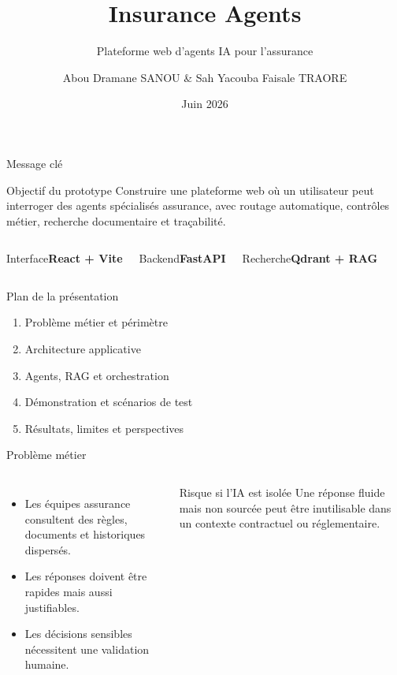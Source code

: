 \documentclass[aspectratio=169]{beamer}
\title{Insurance Agents}
\subtitle{Plateforme web d'agents IA pour l'assurance}
\date{Juin 2026}
\author{Abou Dramane SANOU \& Sah Yacouba Faisale TRAORE}
\institute{CNAM - Projet d'apprentissage automatique}
\newcommand{\metricbox}[2]{%
  \begin{block}{#1}\centering\Large\textbf{#2}\end{block}%
}
\begin{document}
\begin{frame}
  \titlepage
\end{frame}

\begin{frame}{Message clé}
  \begin{block}{Objectif du prototype}
    Construire une plateforme web où un utilisateur peut interroger des agents spécialisés assurance, avec routage automatique, contrôles métier, recherche documentaire et traçabilité.
  \end{block}

  \vspace{0.6em}
  \begin{columns}[T]
      \metricbox{Interface}{React + Vite}
      \metricbox{Backend}{FastAPI}
      \metricbox{Recherche}{Qdrant + RAG}
  \end{columns}
\end{frame}

\begin{frame}{Plan de la présentation}
  \begin{enumerate}
    \item Problème métier et périmètre
    \item Architecture applicative
    \item Agents, RAG et orchestration
    \item Démonstration et scénarios de test
    \item Résultats, limites et perspectives
  \end{enumerate}
\end{frame}

\begin{frame}{Problème métier}
  \begin{columns}[T]
      \begin{itemize}
        \item Les équipes assurance consultent des règles, documents et historiques dispersés.
        \item Les réponses doivent être rapides mais aussi justifiables.
        \item Les décisions sensibles nécessitent une validation humaine.
      \end{itemize}
      \begin{alertblock}{Risque si l'IA est isolée}
        Une réponse fluide mais non sourcée peut être inutilisable dans un contexte contractuel ou réglementaire.
      \end{alertblock}
  \end{columns}
\end{frame}
\end{document}
